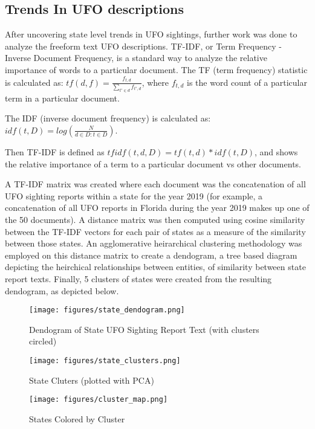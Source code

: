 \documentclass{article}
\begin{document}
\subsection{Trends In UFO descriptions}
\par After uncovering state level trends in UFO sightings, further work was done to analyze the freeform text UFO descriptions. TF-IDF, or Term Frequency - Inverse Document Frequency, is a standard way to analyze the relative importance of words to a particular document. The TF (term frequency) statistic is calculated as: $tf(d,f)=\frac{f_{t,d}}{\sum_{t' \in d}f_{t',d}}$, where $f_{t,d}$ is the word count of a particular term in a particular document. 
\par \noindent The IDF (inverse document frequency) is calculated as: $idf(t,D) = log(\frac{N}{d \in D:t \in D})$.
\par \noindent Then TF-IDF is defined as $tfidf(t,d,D)=tf(t,d)*idf(t,D)$, and shows the relative importance of a term to a particular document vs other documents. 
\par A TF-IDF matrix was created where each document was the concatenation of all UFO sighting reports within a state for the year 2019 (for example, a concatenation of all UFO reports in Florida during the year 2019 makes up one of the 50 documents). A distance matrix was then computed using cosine similarity between the TF-IDF vectors for each pair of states as a measure of the similarity between those states. An agglomerative heirarchical clustering methodology was employed on this distance matrix to create a dendogram, a tree based diagram depicting the heirchical relationships between entities,  of similarity between state report texts. Finally, 5 clusters of states were created from the resulting dendogram, as depicted below. 

\begin{figure}[H]
  \centering
  \texttt{[image: figures/state\_dendogram.png]}
  \caption{Dendogram of State UFO Sighting Report Text (with clusters circled)}
  \label{fig:state_dendogram}
\end{figure}

\begin{figure}[H]
  \centering
  \texttt{[image: figures/state\_clusters.png]}
  \caption{State Cluters (plotted with PCA)}
  \label{fig:state_clusters}
\end{figure}

\begin{figure}[H]
  \centering
  \texttt{[image: figures/cluster\_map.png]}
  \caption{States Colored by Cluster}
  \label{fig:cluster_map}
\end{figure}
\end{document}
